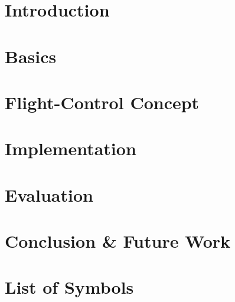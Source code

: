 \documentclass[bachelor,english]{infothesis}
\begin{document}




\setcounter{page}{1}
\chapter{Introduction}
	

\chapter{Basics}
	

%	
	
\chapter{Flight-Control Concept}
	

\chapter{Implementation}
	

%	

\chapter{Evaluation}
	

\chapter{Conclusion \& Future Work}
	

%	
	
\chapter*{List of Symbols}
\end{document}
